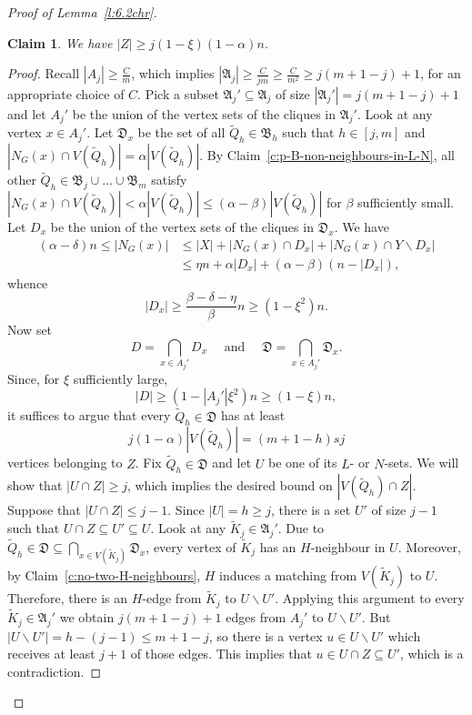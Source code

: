 \documentclass[reqno, 12pt]{amsart}
\numberwithin{equation}{section}
\numberwithin{figure}{section}
\theoremstyle{plain}
\newtheorem{claim}[thm]{Claim}
\theoremstyle{definition}
\def\fA{\mathfrak{A}}
\def \fD{\mathfrak{D}}
\def\fB{\mathfrak{B}}
\let\setminus=\smallsetminus
\begin{document}
\begin{proof}[Proof of Lemma~\ref{l:6.2chr}]
        \begin{claim}
            \label{c:Z-is-large}
            We have $|Z|\geq j(1-\xi)(1-\alpha)n$.
        \end{claim}
        \begin{proof}
            Recall $|A_j|\geq \frac{C}{m}$, which implies $|\fA_j|\geq \frac{C}{jm}\geq \frac{C}{m^2}\geq j(m+1-j)+1$, for an appropriate choice of $C$. Pick a subset $\fA_j'\subseteq \fA_j$ of size $|\fA_j'|=j(m+1-j)+1$ and let $A_j'$ be the union of the vertex sets of the cliques in $\fA_j'$. Look at any vertex $x\in A_j'$. Let $\fD_x$ be the set of all $\tilde Q_h\in \fB_h$ such that $h\in [j,m]$ and $|N_G(x)\cap V(\tilde Q_h)|=\alpha |V(\tilde Q_h)|$.
            By Claim~\ref{c:p-B-non-neighbours-in-L-N}, all other $\tilde Q_h\in \fB_j\cup \dots \cup \fB_m$ satisfy $|N_G(x)\cap V(\tilde Q_h)|<\alpha|V(\tilde Q_h)|\leq (\alpha- \beta)|V(\tilde Q_h)|$ for $\beta$ sufficiently small. Let $D_x$ be the union of the vertex sets of the cliques in $\fD_x$. We have 
            \begin{align*}(\alpha-\delta)n\leq |N_G(x)| &\leq |X|+|N_G(x)\cap D_x|+|N_G(x)\cap Y\setminus D_x|\\
            &\leq \eta n + \alpha |D_x|+(\alpha-\beta)(n-|D_x|),
            \end{align*}
            whence 
            \[|D_x|\geq \frac{\beta-\delta-\eta}{\beta}n\geq (1-\xi^2)n.\]
            Now set 
            \[D=\bigcap_{x\in A_j'}D_x \quad \text{ and } \quad \fD=\bigcap_{x\in A_j'}\fD_x .\]
            Since, for $\xi$ sufficiently large, \[|D|\geq (1-|A_j'|\xi^2)n\geq (1-\xi)n,\]
            it suffices to argue that every $\tilde Q_h\in \fD$ has at least \[j(1-\alpha)|V(\tilde Q_h)|=(m+1-h)sj\] vertices belonging to $Z$. Fix $\tilde Q_h\in \fD$ and let $U$ be one of its $L$- or $N$-sets. We will show that $|U\cap Z|\geq j$, which implies the desired bound on $|V(\tilde Q_h)\cap Z|$. Suppose that $|U\cap Z|\leq j-1$. Since $|U|=h\geq j$, there is a set $U'$ of size $j-1$ such that $U \cap Z\subseteq U'\subseteq U$. Look at any $\tilde K_j \in \fA_j'$. Due to $\tilde Q_h\in \fD\subseteq \bigcap_{x\in V(\tilde K_j)}\fD_x$, every vertex of $\tilde K_j$ has an $H$-neighbour in $U$. Moreover, by Claim~\ref{c:no-two-H-neighbours}, $H$ induces a matching from $V(\tilde K_j)$ to $U$. Therefore, there is an $H$-edge from $\tilde K_j$ to $U\setminus U'$. Applying this argument to every $\tilde K_j \in \fA_j'$ we obtain $j(m+1-j)+1$ edges from $A_j'$ to $U\setminus U'$. But $|U\setminus U'|=h-(j-1)\leq m+1-j$, so there is a vertex $u\in U\setminus U'$ which receives at least $j+1$ of those edges. This implies that $u\in U\cap Z \subseteq U'$, which is a contradiction.
        \end{proof}


\end{proof}
\end{document}
